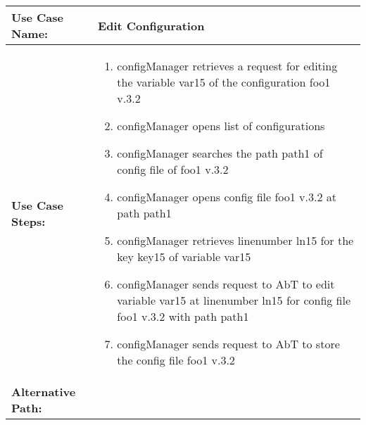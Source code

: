 
\begin{tabularx}{\linewidth}{|l|X|}
\hline
\textbf{Use Case Name:} & \textbf{Edit Configuration} \\
\hline
\textbf{Use Case Steps:} & 
\begin{minipage}{\linewidth} 
  \vspace{0.05em}
  \begin{enumerate}
	\item configManager retrieves a request for editing the variable var15 of the configuration foo1 v.3.2
	\item configManager opens list of configurations
	\item configManager searches the path path1 of config file of foo1 v.3.2
	\item configManager opens config file foo1 v.3.2 at path path1
	\item configManager retrieves linenumber ln15 for the key key15 of variable var15
	\item configManager sends request to AbT to edit variable var15 at linenumber ln15 for config file foo1 v.3.2 with path path1
	\item configManager sends request to AbT to store the config file foo1 v.3.2 
  \end{enumerate}
  \vspace{0.05em}
\end{minipage}
\\
\hline 
\textbf{Alternative Path:} &
\begin{minipage}{\linewidth}
  \vspace{0.05em} 
  \vspace{0.05em} 
\end{minipage}
\\
\hline
\end{tabularx}


